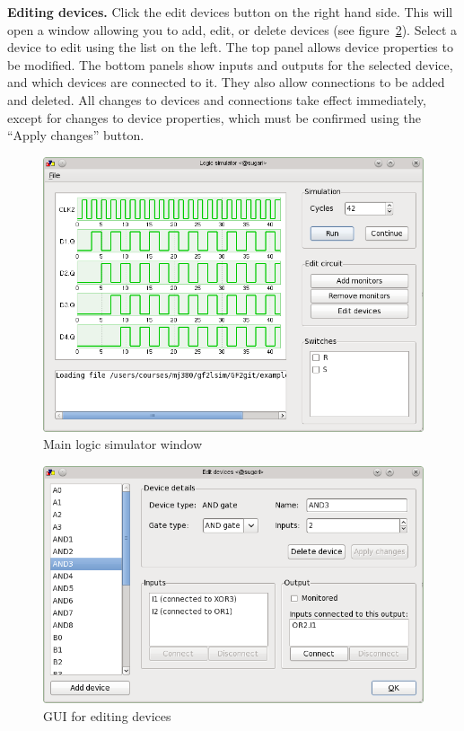 \documentclass[a4paper,10pt]{article}
\begin{document}
\textbf{Editing devices.} Click the edit devices button on the right hand side. This will open a window allowing you to add, edit, or delete devices (see figure~\ref{fig:gui-devices}). Select a device to edit using the list on the left. The top panel allows device properties to be modified. The bottom panels show inputs and outputs for the selected device, and which devices are connected to it. They also allow connections to be added and deleted. All changes to devices and connections take effect immediately, except for changes to device properties, which must be confirmed using the ``Apply changes'' button. 

\begin{figure}[h]
 \centering
 \includegraphics[width=16cm]{simulation.png}
 \caption{Main logic simulator window}
 \label{fig:gui-main}
\end{figure}
\begin{figure}[h]
 \centering
 \includegraphics[width=16cm]{devices.png}
 \caption{GUI for editing devices}
 \label{fig:gui-devices}
\end{figure}
\end{document}
